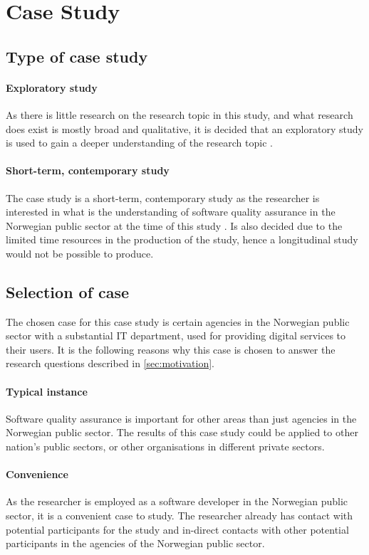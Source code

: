 \section{Case Study}

\subsection{Type of case study}
\paragraph{Exploratory study}
As there is little research on the research topic in this study, and what research does exist is mostly broad and qualitative, it is decided that an exploratory study is used to gain a deeper understanding of the research topic \cite{bjo_2022}.

\paragraph{Short-term, contemporary study} 
The case study is a short-term, contemporary study as the researcher is interested in what is the understanding of software quality assurance in the Norwegian public sector at the time of this study \cite{bjo_2022}. Is also decided due to the limited time resources in the production of the study, hence a longitudinal study would not be possible to produce.

\subsection{Selection of case}
The chosen case for this case study is certain agencies in the Norwegian public sector with a substantial IT department, used for providing digital services to their users. It is the following reasons why this case is chosen to answer the research questions described in \autoref{sec:motivation}.

\paragraph{Typical instance}
Software quality assurance is important for other areas than just agencies in the Norwegian public sector. The results of this case study could be applied to other nation's public sectors, or other organisations in different private sectors.

\paragraph{Convenience}
As the researcher is employed as a software developer in the Norwegian public sector, it is a convenient case to study. The researcher already has contact with potential participants for the study and in-direct contacts with other potential participants in the agencies of the Norwegian public sector.

